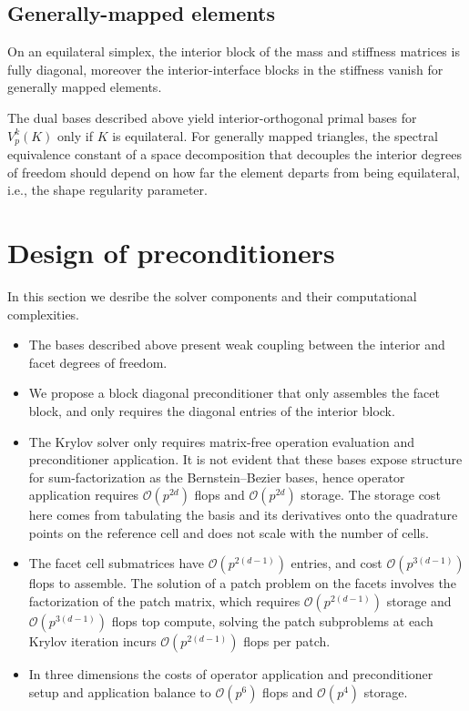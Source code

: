 \documentclass[review,onefignum,onetabnum,a4paper]{siamart190516}
\newcommand{\bigo}[1]{\mathcal{O}(#1)}
\begin{document}
\subsection{Generally-mapped elements}

On an equilateral simplex, the interior block of the mass and stiffness matrices
is fully diagonal, moreover the interior-interface blocks in the stiffness 
vanish for generally mapped elements.

The dual bases described above yield interior-orthogonal primal bases for $V^k_p(K)$ only
if $K$ is equilateral. For generally mapped triangles, the spectral equivalence constant of
a space decomposition that decouples the interior degrees of freedom should depend on how
far the element departs from being equilateral, i.e., the shape regularity parameter. 



\section{Design of preconditioners}
In this section we desribe the solver components and their computational complexities.


\begin{itemize}
\item The bases described above present weak coupling between the interior and facet degrees of freedom.
\item We propose a block diagonal preconditioner that only assembles the facet block, and only requires the diagonal entries of the interior block.
\item The Krylov solver only requires matrix-free operation evaluation and preconditioner application. It is not evident that these bases expose structure for sum-factorization as the Bernstein--Bezier bases, hence operator application requires $\bigo{p^{2d}}$ flops and $\bigo{p^{2d}}$ storage. The storage cost here comes from tabulating the basis and its derivatives onto the quadrature points on the reference cell and does not scale with the number of cells.
\item The facet cell submatrices have $\bigo{p^{2(d-1)}}$ entries, and cost $\bigo{p^{3(d-1)}}$ flops to assemble. 
The solution of a patch problem on the facets involves the factorization of the patch matrix, which requires $\bigo{p^{2(d-1)}}$ storage and $\bigo{p^{3(d-1)}}$ flops top compute, solving the patch subproblems at each Krylov iteration incurs $\bigo{p^{2(d-1)}}$ flops per patch. 
\item In three dimensions the costs of operator application and preconditioner setup and application balance to $\bigo{p^6}$ flops and $\bigo{p^4}$ storage.
\end{itemize}
\end{document}
